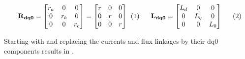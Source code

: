 \vspace{0.5cm}
\begin{subequations}
	\begin{minipage}{.53\linewidth}
		\begin{equation}
            \mathbf{R_{dq0}} =
            \begin{bmatrix}
                r_a & 0   & 0   \\
                0   & r_b & 0   \\
                0   & 0   & r_c \\
            \end{bmatrix} =
            \begin{bmatrix}
                r & 0 & 0 \\
                0 & r & 0 \\
                0 & 0 & r \\
            \end{bmatrix}
		\end{equation}
	\end{minipage}%
	\begin{minipage}{.43\linewidth}
		\begin{equation}
            \mathbf{L_{dq0}} =
            \begin{bmatrix}
                L_d & 0   & 0   \\
                0   & L_q & 0   \\
                0   & 0   & L_0 \\
            \end{bmatrix}
		\end{equation}
    \end{minipage}
	\label{eq:inductance_and_resistance_dqd0}
\end{subequations}
\vspace{0.5cm}

Starting with  and replacing the currents and flux linkages by their dq0 components results in .

